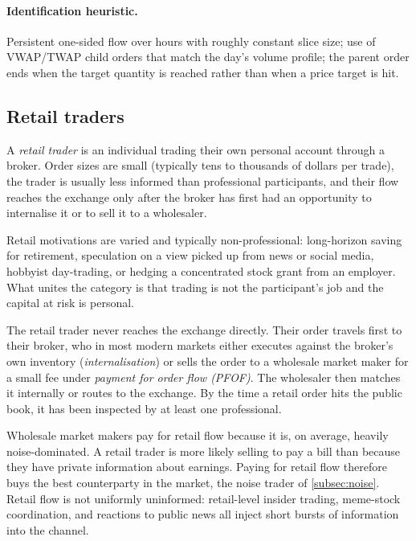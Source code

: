 \paragraph{Identification heuristic.} Persistent one-sided flow over
hours with roughly constant slice size; use of VWAP/TWAP child orders
that match the day's volume profile; the parent order ends when the
target quantity is reached rather than when a price target is hit.

\subsection{Retail traders}
\label{subsec:retail}

\begin{definition}
A \emph{retail trader} is an individual trading their own personal
account through a broker. Order sizes are small (typically tens to
thousands of dollars per trade), the trader is usually less informed
than professional participants, and their flow reaches the exchange
only after the broker has first had an opportunity to internalise it
or to sell it to a wholesaler.
\end{definition}

Retail motivations are varied and typically non-professional:
long-horizon saving for retirement, speculation on a view picked up
from news or social media, hobbyist day-trading, or hedging a
concentrated stock grant from an employer. What unites the category
is that trading is not the participant's job and the capital at risk
is personal.

The retail trader never reaches the exchange directly. Their order
travels first to their broker, who in most modern markets either
executes against the broker's own inventory (\emph{internalisation})
or sells the order to a wholesale market maker for a small fee under
\emph{payment for order flow (PFOF)}. The wholesaler then matches it
internally or routes to the exchange. By the time a retail order
hits the public book, it has been inspected by at least one
professional.

Wholesale market makers pay for retail flow because it is, on average,
heavily noise-dominated. A retail trader is more likely selling to
pay a bill than because they have private information about earnings.
Paying for retail flow therefore buys the best counterparty in the
market, the noise trader of \cref{subsec:noise}. Retail flow is
not uniformly uninformed: retail-level insider trading, meme-stock
coordination, and reactions to public news all inject short bursts of
information into the channel.

